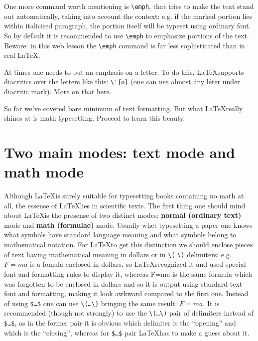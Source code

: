 {\par One more command worth mentioning is \verb"\emph", that tries to make the text stand out automatically, taking into account the context: e.g. if the marked portion lies within italicised paragraph, the portion itself will be typeset using ordinary font. So by default it is recommended to use \verb"\emph" to emphasize portions of the text. Beware: in this web lesson the \verb"\emph" command is far less sophisticated than in real \LaTeX.

\par At times one needs to put an emphasis on a letter. To do this, \LaTeX supports diacritics over the letters like this: \verb"\'{o}" (one can use almost \'{a}ny l\'{e}ter under diacritic mark). More on that \href{https://en.wikibooks.org/wiki/LaTeX/Special_Characters#Escaped_codes}{here}.

\par So far we’ve covered bare minimum of text formatting. But what \LaTeX really shines at is math typesetting. Proceed to learn this beauty.


\section{Two main modes: text mode and math mode}
\par Although \LaTeX is surely suitable for typesetting books containing no math at all, the essense of \LaTeX lies in scientific texts. The first thing one should mind about \LaTeX is the presense of two distinct modes: \textbf{normal (ordinary text)} mode and \textbf{math (formulae)} mode. Usually whet typesetting a paper one knows what symbols have standard language meaning and what symbols belong to mathematical notation. For \LaTeX to get this distinction we should enclose pieces of text having mathematical meaning in dollars or in \verb"\(" \verb"\)" delimiters: e.g. $F=ma$ is a fomula enclosed in dollars, so \LaTeX recognized it and used special font and formatting rules to display it, whereas F=ma is the same formula which was forgotten to be enclosed in dollars and so it is output using standard text font and formatting, making it look awkward compared to the first one. Instead of using \verb"$…$" one can use \verb"\(…\)" bringing the same result: \(F=ma.\) It is recommended (though not strongly) to use the \verb"\(…\)" pair of delimiters instead of \verb"$…$", as in the former pair it is obvious which delimiter is the “opening” and which is the “closing”, whereas for \verb"$…$" pair \LaTeX has to make a guess about it.


}
